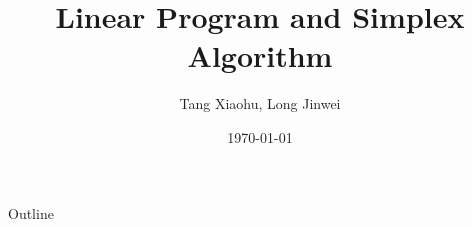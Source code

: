 \documentclass{beamer}
\title[Your Short Title]{Linear Program and Simplex Algorithm}
\author{Tang Xiaohu, Long Jinwei}
\institute{Zhejiang University}
\date{\today}
\begin{document}
\begin{frame}
  \titlepage
\end{frame}

\begin{frame}{Outline}
 \tableofcontents
\end{frame}




\end{document}
